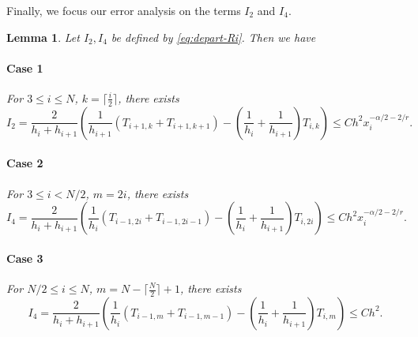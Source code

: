 \documentclass{amsart}
\newtheorem{lemma}[theorem]{Lemma}
\theoremstyle{definition}
\theoremstyle{remark}
\numberwithin{equation}{section}
\begin{document}
Finally, we focus our error analysis on the terms \(I_2\) and \(I_4\). %
\begin{lemma} \label{lmm:Ri-I2-I4-ilN/2}
Let \(I_2, I_4\) be defined by \eqref{eq:depart-Ri}. Then we have
\paragraph{Case 1}
For \(3\le i \le N\), \(k=\lceil\frac{i}{2}\rceil\), there exists
\begin{equation*}
  I_2 = \frac{2}{h_i + h_{i+1}}
  \left( \frac{1}{h_{i+1}} (T_{i+1, k} +  T_{i+1, k+1})
  - \left(\frac{1}{h_{i}}+\frac{1}{h_{i+1}}\right) T_{i,k} \right) \le C h^2 x_i^{-\alpha/2-2/r} .
\end{equation*}
\paragraph{Case 2}
For \(3\le i < N/2\), $m=2i$, there exists
\begin{equation*}
  I_4 = \frac{2}{h_i + h_{i+1}}
  \left( \frac{1}{h_{i}} (T_{i-1, 2i} +  T_{i-1, 2i-1})
  - \left(\frac{1}{h_{i}}+\frac{1}{h_{i+1}}\right) T_{i,2i} \right) \le C h^2 x_i^{-\alpha/2-2/r} .
\end{equation*}
\paragraph{Case 3}
For \(N/2 \le i \le N\), \(m=N-\lceil\frac{N}{2}\rceil+1\), there exists
\begin{equation*}
  I_4 = \frac{2}{h_i + h_{i+1}}
  \left( \frac{1}{h_{i}} (T_{i-1, m} +  T_{i-1, m-1})
  - \left(\frac{1}{h_{i}}+\frac{1}{h_{i+1}}\right) T_{i,m} \right) \le C h^2 .
\end{equation*}
\end{lemma}
\end{document}
